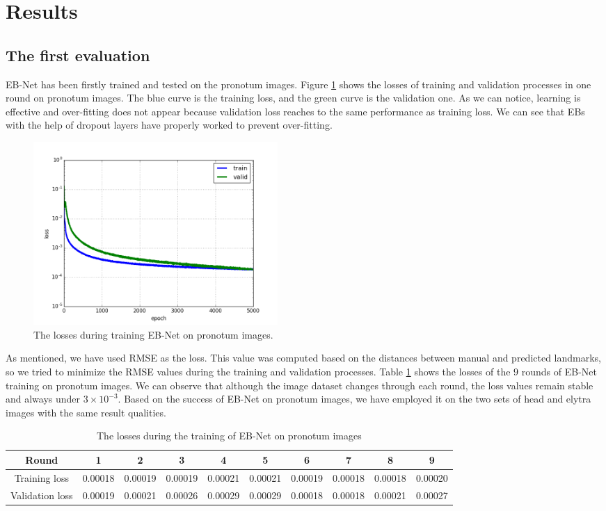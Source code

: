 \documentclass[review]{elsarticle}
\begin{document}
\section{Results}
\label{sec3}
\subsection{The first evaluation}
\label{subsec31}
EB-Net has been firstly trained and tested on the pronotum images. Figure \ref{figdlosses} shows the losses of training and validation processes in one round on pronotum images. The blue curve is the training loss, and the green curve is the validation one. As we can notice, learning is effective and over-fitting does not appear because validation loss reaches to the same performance as training loss. We can see that EBs with the help of dropout layers have properly worked to prevent over-fitting.

\begin{figure}[h!]
    \centering
	\includegraphics[width=0.45\textwidth]{./images/loss_v16}
    \caption{The losses during training EB-Net on pronotum images.}
    \label{figdlosses}
\end{figure}

As mentioned, we have used RMSE as the loss. This value was computed based on the distances between manual and predicted landmarks, so we tried to minimize the RMSE values during the training and validation processes. Table \ref{tbltrainingloss} shows the losses of the $9$ rounds of EB-Net training on pronotum images. We can observe that although the image dataset changes through each round, the loss values remain stable and always under $3 \times 10^{-3}$. Based on the success of EB-Net on pronotum images, we have employed it on the two sets of head and elytra images with the same result qualities.

\begin{table}[h!]
	\centering
	\begin{tabular}{| c | c | c | c | c | c | c | c | c | c |}
	\hline
	Round & 1 & 2 & 3 & 4 & 5 & 6 & 7 & 8 & 9 \\ \hline
Training loss & 0.00018 & 0.00019 & 0.00019 & 0.00021 & 0.00021 & 0.00019 & 0.00018 & 0.00018 & 0.00020 \\ \hline
Validation loss & 0.00019 & 0.00021 & 0.00026 & 0.00029 & 0.00029 & 0.00018 & 0.00018 & 0.00021 & 0.00027 \\ \hline
	\end{tabular}
	\caption{The losses during the training of EB-Net on pronotum images}
	\label{tbltrainingloss}
\end{table}
\end{document}
